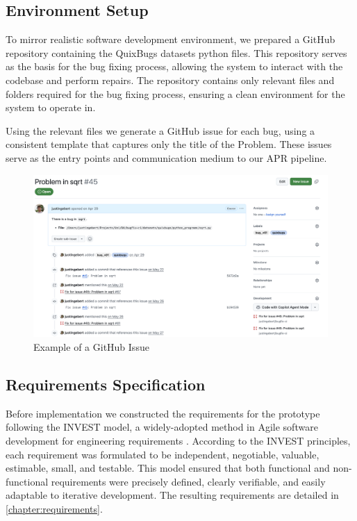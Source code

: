 \subsection{Environment Setup} \label{subsection:environment-setup}
To mirror realistic software development environment, we prepared a GitHub repository containing the QuixBugs datasets python files. This repository serves as the basis for the bug fixing process, allowing the system to interact with the codebase and perform repairs. The repository contains only relevant files and folders required for the bug fixing process, ensuring a clean environment for the system to operate in.

Using the relevant files we generate a GitHub issue for each bug, using a consistent template that captures only the title of the Problem. These issues serve as the entry points and communication medium to our APR pipeline.

\begin{figure}[H]
    \centering
    \includegraphics[width=1\textwidth]{images/github/GitHub Issue.png}
    \caption{Example of a GitHub Issue}
    \label{fig:gh-issue2}
\end{figure}

\subsection{Requirements Specification}

Before implementation we constructed the requirements for the prototype following the INVEST model, a widely-adopted method in Agile software development for engineering requirements \cite{10.5555/984017}. According to the INVEST principles, each requirement was formulated to be independent, negotiable, valuable, estimable, small, and testable. This model ensured that both functional and non-functional requirements were precisely defined, clearly verifiable, and easily adaptable to iterative development. The resulting requirements are detailed in \ref{chapter:requirements}.
